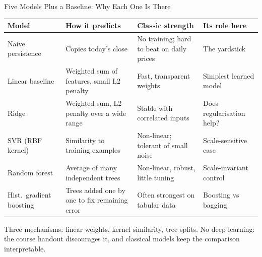\documentclass[aspectratio=169,11pt]{beamer}
\newcommand{\currentspeaker}{}
\newcommand{\speaker}[1]{\gdef\currentspeaker{#1}}
\begin{document}
\begin{frame}{Five Models Plus a Baseline: Why Each One Is There}
  \speaker{Zhang Yancheng}
  \centering\scriptsize
  \renewcommand{\arraystretch}{1.12}
  \begin{tabular}{@{}l>{\raggedright\arraybackslash}p{.23\linewidth}>{\raggedright\arraybackslash}p{.25\linewidth}>{\raggedright\arraybackslash}p{.22\linewidth}@{}}
    \toprule
    \textbf{Model} & \textbf{How it predicts} & \textbf{Classic strength} & \textbf{Its role here} \\
    \midrule
    Naive persistence & Copies today's close & No training; hard to beat on daily prices & The yardstick \\
    Linear baseline & Weighted sum of features, small L2 penalty & Fast, transparent weights & Simplest learned model \\
    Ridge & Weighted sum, L2 penalty over a wide range & Stable with correlated inputs & Does regularisation help? \\
    SVR (RBF kernel) & Similarity to training examples & Non-linear; tolerant of small noise & Scale-sensitive case \\
    Random forest & Average of many independent trees & Non-linear, robust, little tuning & Scale-invariant control \\
    Hist.\ gradient boosting & Trees added one by one to fix remaining error & Often strongest on tabular data & Boosting vs bagging \\
    \bottomrule
  \end{tabular}
  \par\vspace{3mm}
  \raggedright\footnotesize
  Three mechanisms: linear weights, kernel similarity, tree splits. No deep learning: the course
  handout discourages it, and classical models keep the comparison interpretable.
\end{frame}
\end{document}
